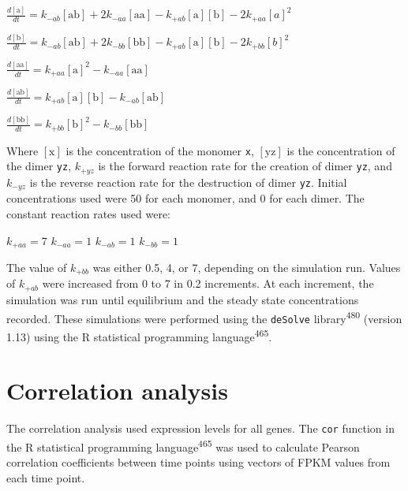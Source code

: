 \documentclass[12pt,]{book}
\begin{document}
\begin{center}


\end{center}

\(\frac{d[\text{a}]}{dt} = k_{-ab}[\text{ab}] + 2k_{-aa}[\text{aa}] - k_{+ab}[\text{a}][\text{b}]-2k_{+aa}[a]^2\)

\(\frac{d[\text{b}]}{dt} = k_{-ab}[\text{ab}] + 2k_{-bb}[\text{bb}] - k_{+ab}[\text{a}][\text{b}]-2k_{+bb}[b]^2\)

\(\frac{d[\text{aa}]}{dt} = k_{+aa}[\text{a}]^2 - k_{-aa}[\text{aa}]\)

\(\frac{d[\text{ab}]}{dt} = k_{+ab}[\text{a}][\text{b}] - k_{-ab}[\text{ab}]\)

\(\frac{d[\text{bb}]}{dt} = k_{+bb}[\text{b}]^2 - k_{-bb}[\text{bb}]\)

Where \([\text{x}]\) is the concentration of the monomer \texttt{x},
\([\text{yz}]\) is the concentration of the dimer \texttt{yz},
\(k_{+yz}\) is the forward reaction rate for the creation of dimer
\texttt{yz}, and \(k_{-yz}\) is the reverse reaction rate for the
destruction of dimer \texttt{yz}. Initial concentrations used were 50
for each monomer, and 0 for each dimer. The constant reaction rates used
were:

\(k_{+aa} = 7\) \(k_{-aa} = 1\) \(k_{-ab} = 1\) \(k_{-bb} = 1\)

The value of \(k_{+bb}\) was either 0.5, 4, or 7, depending on the
simulation run. Values of \(k_{+ab}\) were increased from 0 to 7 in 0.2
increments. At each increment, the simulation was run until equilibrium
and the steady state concentrations recorded. These simulations were
performed using the \texttt{deSolve} library\textsuperscript{480}
(version 1.13) using the R statistical programming
language\textsuperscript{465}.

\section{Correlation analysis}\label{correlation-analysis}

The correlation analysis used expression levels for all genes. The
\texttt{cor} function in the R statistical programming
language\textsuperscript{465} was used to calculate Pearson correlation
coefficients between time points using vectors of FPKM values from each
time point.
\end{document}
